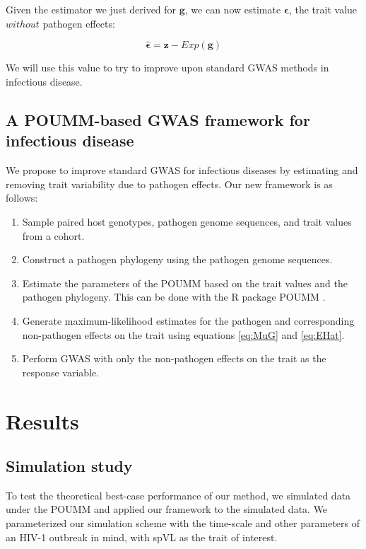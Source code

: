 \documentclass[11pt]{article}
\begin{document}
\begin{linenumbers}
Given the estimator we just derived for $\bm{g}$, we can now estimate $\bm{\epsilon}$, the trait value $without$ pathogen effects: 

\begin{equation}
	\hat{\bm{\epsilon}} = \bm{z} - Exp(\bm{g})
	\label{eq:EHat}
\end{equation}

We will use this value to try to improve upon standard GWAS methods in infectious disease.

\subsection*{A POUMM-based GWAS framework for infectious disease}

We propose to improve standard GWAS for infectious diseases by estimating and removing trait variability due to pathogen effects. Our new framework is as follows:

\begin{enumerate}
	\item Sample paired host genotypes, pathogen genome sequences, and trait values from a cohort.
	\item Construct a pathogen phylogeny using the pathogen genome sequences.
	\item Estimate the parameters of the POUMM based on the trait values and the pathogen phylogeny. This can be done with the R package POUMM \citep{Mitov2017a-POUMM}.
	\item Generate maximum-likelihood estimates for the pathogen and corresponding non-pathogen effects on the trait using equations \ref{eq:MuG} and \ref{eq:EHat}.
	\item Perform GWAS with only the non-pathogen effects on the trait as the response variable.
\end{enumerate}

\section*{Results}

\subsection*{Simulation study}

To test the theoretical best-case performance of our method, we simulated data under the POUMM and applied our framework to the simulated data. We parameterized our simulation scheme with the time-scale and other parameters of an HIV-1 outbreak in mind, with spVL as the trait of interest. 


\end{linenumbers}
\end{document}
